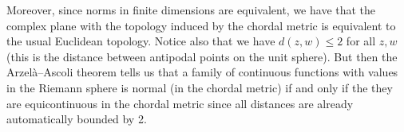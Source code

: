 Moreover, since norms in finite dimensions are equivalent, we have that the complex plane with the topology induced by the chordal metric is equivalent to the usual Euclidean topology. Notice also that we have $d(z, w) \leq 2$ for all $z, w$ (this is the distance between antipodal points on the unit sphere). But then the Arzelà–Ascoli theorem tells us that a family of continuous functions with values in the Riemann sphere is normal (in the chordal metric) if and only if the they are equicontinuous in the chordal metric since all distances are already automatically bounded by 2. 